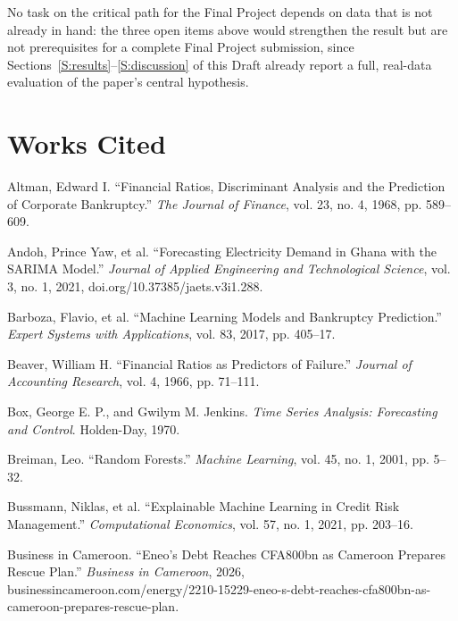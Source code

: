 \documentclass[final,1p,times]{elsarticle}
\begin{document}
No task on the critical path for the Final Project depends on data that is not already in hand: the three open items above would strengthen the result but are not prerequisites for a complete Final Project submission, since Sections~\ref{S:results}--\ref{S:discussion} of this Draft already report a full, real-data evaluation of the paper's central hypothesis.

\section*{Works Cited}
\label{S:refs}

\begin{list}{}{\setlength{\leftmargin}{0.5in}\setlength{\itemindent}{-0.5in}\setlength{\itemsep}{10pt}\setlength{\parsep}{0pt}}

\item Altman, Edward I. ``Financial Ratios, Discriminant Analysis and the Prediction of Corporate Bankruptcy.'' \textit{The Journal of Finance}, vol. 23, no. 4, 1968, pp. 589--609.

\item Andoh, Prince Yaw, et al. ``Forecasting Electricity Demand in Ghana with the SARIMA Model.'' \textit{Journal of Applied Engineering and Technological Science}, vol. 3, no. 1, 2021, doi.org/10.37385/jaets.v3i1.288.

\item Barboza, Flavio, et al. ``Machine Learning Models and Bankruptcy Prediction.'' \textit{Expert Systems with Applications}, vol. 83, 2017, pp. 405--17.

\item Beaver, William H. ``Financial Ratios as Predictors of Failure.'' \textit{Journal of Accounting Research}, vol. 4, 1966, pp. 71--111.

\item Box, George E. P., and Gwilym M. Jenkins. \textit{Time Series Analysis: Forecasting and Control}. Holden-Day, 1970.

\item Breiman, Leo. ``Random Forests.'' \textit{Machine Learning}, vol. 45, no. 1, 2001, pp. 5--32.

\item Bussmann, Niklas, et al. ``Explainable Machine Learning in Credit Risk Management.'' \textit{Computational Economics}, vol. 57, no. 1, 2021, pp. 203--16.

\item Business in Cameroon. ``Eneo's Debt Reaches CFA800bn as Cameroon Prepares Rescue Plan.'' \textit{Business in Cameroon}, 2026, businessincameroon.com/energy/2210-15229-eneo-s-debt-reaches-cfa800bn-as-cameroon-prepares-rescue-plan.


\end{list}
\end{document}
